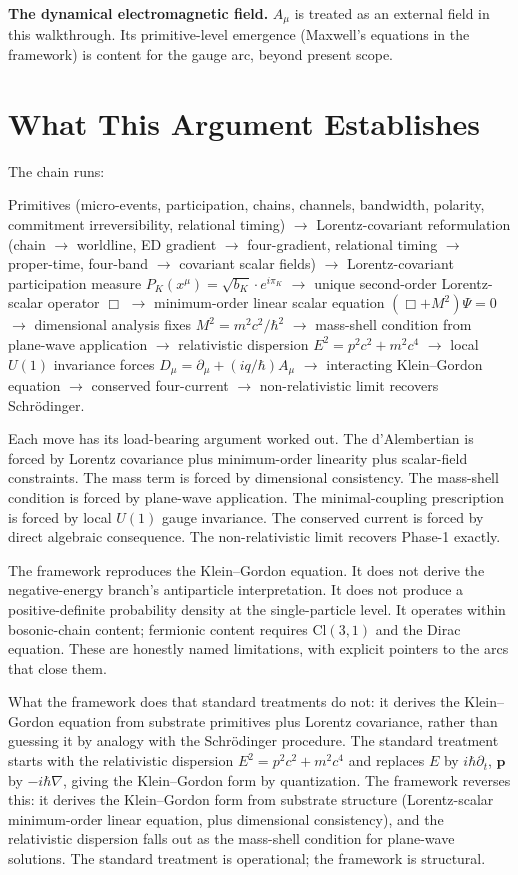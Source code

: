 \documentclass[11pt,a4paper]{article}
\begin{document}
\textbf{The dynamical electromagnetic field.} $A_\mu$ is treated as an external field in this walkthrough. Its primitive-level emergence (Maxwell's equations in the framework) is content for the gauge arc, beyond present scope.

\section{What This Argument Establishes}

The chain runs:

Primitives (micro-events, participation, chains, channels, bandwidth, polarity, commitment irreversibility, relational timing) $\to$ Lorentz-covariant reformulation (chain $\to$ worldline, ED gradient $\to$ four-gradient, relational timing $\to$ proper-time, four-band $\to$ covariant scalar fields) $\to$ Lorentz-covariant participation measure $P_K(x^\mu) = \sqrt{b_K}\cdot e^{i\pi_K}$ $\to$ unique second-order Lorentz-scalar operator $\Box$ $\to$ minimum-order linear scalar equation $(\Box + M^2)\Psi = 0$ $\to$ dimensional analysis fixes $M^2 = m^2c^2/\hbar^2$ $\to$ mass-shell condition from plane-wave application $\to$ relativistic dispersion $E^2 = p^2c^2 + m^2c^4$ $\to$ local $U(1)$ invariance forces $D_\mu = \partial_\mu + (iq/\hbar)A_\mu$ $\to$ interacting Klein--Gordon equation $\to$ conserved four-current $\to$ non-relativistic limit recovers Schr\"odinger.

Each move has its load-bearing argument worked out. The d'Alembertian is forced by Lorentz covariance plus minimum-order linearity plus scalar-field constraints. The mass term is forced by dimensional consistency. The mass-shell condition is forced by plane-wave application. The minimal-coupling prescription is forced by local $U(1)$ gauge invariance. The conserved current is forced by direct algebraic consequence. The non-relativistic limit recovers Phase-1 exactly.

The framework reproduces the Klein--Gordon equation. It does not derive the negative-energy branch's antiparticle interpretation. It does not produce a positive-definite probability density at the single-particle level. It operates within bosonic-chain content; fermionic content requires $\mathrm{Cl}(3,1)$ and the Dirac equation. These are honestly named limitations, with explicit pointers to the arcs that close them.

What the framework does that standard treatments do not: it derives the Klein--Gordon equation from substrate primitives plus Lorentz covariance, rather than guessing it by analogy with the Schr\"odinger procedure. The standard treatment starts with the relativistic dispersion $E^2 = p^2c^2 + m^2c^4$ and replaces $E$ by $i\hbar\partial_t$, $\mathbf{p}$ by $-i\hbar\nabla$, giving the Klein--Gordon form by quantization. The framework reverses this: it derives the Klein--Gordon form from substrate structure (Lorentz-scalar minimum-order linear equation, plus dimensional consistency), and the relativistic dispersion falls out as the mass-shell condition for plane-wave solutions. The standard treatment is operational; the framework is structural.
\end{document}
